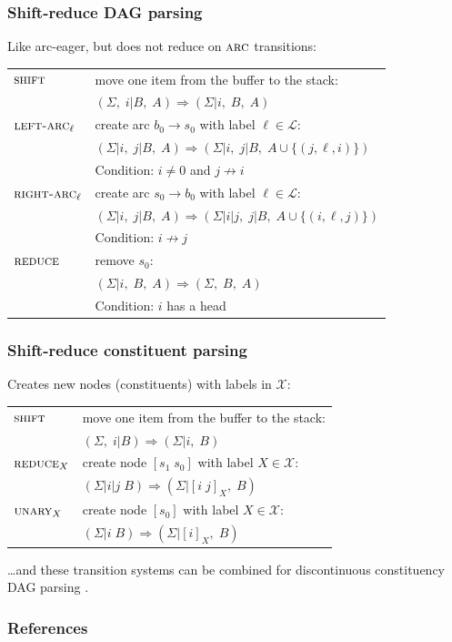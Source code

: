 \documentclass[t]{beamer}
\begin{document}
\begin{frame}
  \frametitle{Shift-reduce DAG parsing \cite{sagae2008shift}}
  Like arc-eager, but does not reduce on $\textsc{arc}$ transitions:

  \begin{tabular}{ll}
    $\textsc{shift}$ & move one item from the buffer to the stack: \\
    & $(\Sigma, \; i | B, \; A) \Rightarrow (\Sigma | i, \; B, \; A)$ \\
    \hline
    $\textsc{left-arc}_\ell$ & create arc $b_0 \to s_0$ with label $\ell \in \mathcal{L}$: \\
    & $(\Sigma | i, \; j | B, \; A) \Rightarrow (\Sigma | i, \; j | B, \; A \cup \{(j,\ell,i)\})$ \\
    & Condition: $i\neq0$ and $j\not\to i$ \\
    \hline
    $\textsc{right-arc}_\ell$ & create arc $s_0 \to b_0$ with label $\ell \in \mathcal{L}$: \\
    & $(\Sigma | i, \; j | B, \; A) \Rightarrow (\Sigma | i|j, \; j | B, \; A \cup \{(i,\ell,j)\})$   \\
    & Condition: $i\not\to j$ \\
    \hline
    $\textsc{reduce}$ & remove $s_0$: \\
    & $(\Sigma | i, \; B, \; A) \Rightarrow (\Sigma, \; B, \; A)$ \\
    & Condition: $i$ has a head
  \end{tabular}
\end{frame}

\begin{frame}
  \frametitle{Shift-reduce constituent parsing \cite{sagae2005classifier}}
  Creates new nodes (constituents) with labels in $\mathcal{X}$:

  \begin{tabular}{ll}
    $\textsc{shift}$ & move one item from the buffer to the stack: \\
    & $(\Sigma, \; i | B) \Rightarrow (\Sigma | i, \; B)$ \\
    \hline
    $\textsc{reduce}_X$ & create node $[s_1\;s_0]$ with label $X \in \mathcal{X}$: \\
    & $(\Sigma | i|j \; B) \Rightarrow (\Sigma | [i\;j]_X, \; B)$ \\
    \hline
    $\textsc{unary}_X$ & create node $[s_0]$ with label $X \in \mathcal{X}$: \\
    & $(\Sigma | i \; B) \Rightarrow (\Sigma | [i]_X, \; B)$
  \end{tabular}
  
  \pause\vfill
  
  \ldots and these transition systems can be combined for
  discontinuous constituency DAG parsing \cite{hershcovich2017a}.
\end{frame}


\begin{frame}[allowframebreaks]
\frametitle{References}

\tiny
\end{frame}
\end{document}
